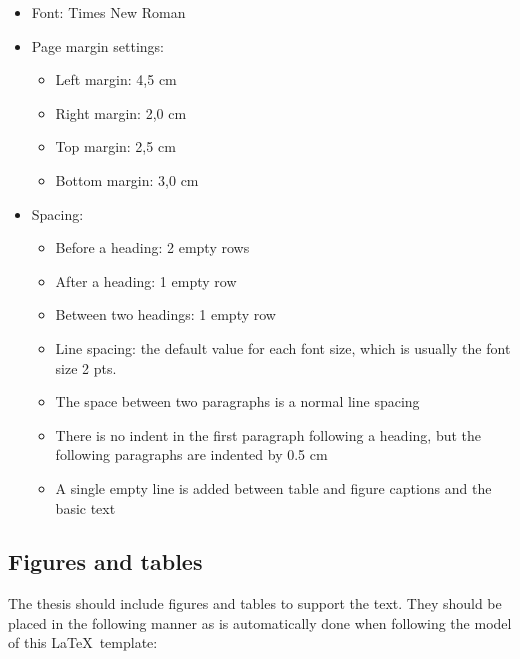 \begin{itemize}
    \setlength\itemsep{0pt}
    \setlength\parskip{0pt}
  \item Font: Times New Roman
  \item Page margin settings:
    \begin{itemize}[wide=0pt]
        \setlength\itemsep{0pt}
        \setlength\parskip{0pt}
      \item Left margin: 4,5 cm
      \item Right margin: 2,0 cm
      \item Top margin: 2,5 cm
      \item Bottom margin: 3,0 cm
    \end{itemize}
  \item Spacing:
    \begin{itemize}[wide=0pt]
        \setlength\itemsep{0pt}
        \setlength\parskip{0pt}
      \item Before a heading: 2 empty rows
      \item After a heading: 1 empty row
      \item Between two headings: 1 empty row
      \item Line spacing: the default value for each font size, which
        is usually the font size 2 pts.
      \item The space between two paragraphs is a normal line spacing
      \item There is no indent in the first paragraph following a
        heading, but the following
        paragraphs are indented by 0.5 cm
      \item A single empty line is added between table and figure
        captions and the basic text
    \end{itemize}
\end{itemize}

\subsection{Figures and tables}
The thesis should include figures and tables to support the text.
They should be placed in the following manner as is automatically
done when following the model of this \LaTeX\ template:

